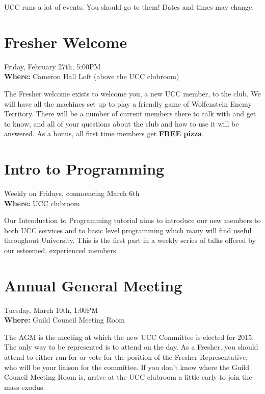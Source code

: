 
UCC runs a lot of events. You should go to them! Dates and times may change. 

\newenvironment{event}[3]
{
	\begin{mdframed}[backgroundcolor=white,nobreak=true]
		\color{black}{\section{#1}}
		\begin{mdframed}[backgroundcolor=white]
			When: #2
			Where: #3
		\end{mdframed}
}{
	\end{mdframed}
}

\renewenvironment{event}[3]
{
	\section{#1}
	 #2 \\
	{\bf Where:} #3

}{}





\begin{event}{Fresher Welcome}{Friday, February 27th, 5:00PM}{Cameron Hall Loft (above the UCC clubroom)}
The Fresher welcome exists to welcome you, a new UCC member, to the club. We will have all the machines set up to play a friendly game of Wolfenstein Enemy Territory. There will be a number of current members there to talk with and get to know, and all of your questions about the club and how to use it will be answered. As a bonus, all first time members get {\bf FREE pizza}.
\end{event}

\begin{event}{Intro to Programming}{Weekly on Fridays, commencing March 6th}{UCC clubroom}
Our Introduction to Programming tutorial aims to introduce our new members to both UCC services and to basic level programming which many will find useful throughout University. This is the first part in a weekly series of talks offered by our esteemed, experienced members.
\end{event}

\begin{event}{Annual General Meeting}{Tuesday, March 10th, 1:00PM}{Guild Council Meeting Room}
The AGM is the meeting at which the new UCC Committee is elected for 2015. The only way to be represented is to attend on the day. As a Fresher, you should attend to either run for or vote for the position of the Fresher Representative, who will be your liaison for the committee. If you don't know where the Guild Council Meeting Room is, arrive at the UCC clubroom a little early to join the mass exodus.
\end{event}

